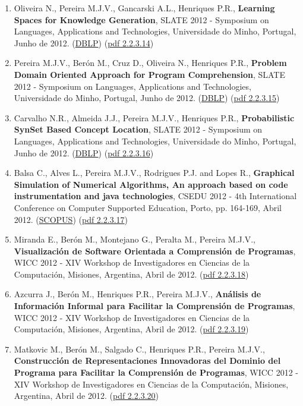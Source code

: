 \documentclass[11pt]{article}
\begin{document}
\begin{enumerate}
\item {Oliveira N., Pereira M.J.V., Gancarski A.L., Henriques P.R., {\bf{ Learning Spaces for Knowledge Generation}}, SLATE 2012 - Symposium on Languages, Applications and Technologies, Universidade do Minho, Portugal, Junho de 2012. (\href{run:Publicacoes/ComprovativosDBLP.pdf}{DBLP}) (\href{run:Publicacoes/publicacoes/69.pdf}{pdf 2.2.3.14})}
\item {Pereira M.J.V., Berón M., Cruz D., Oliveira N., Henriques P.R., {\bf{ Problem Domain Oriented Approach for Program Comprehension}}, SLATE 2012 - Symposium on Languages, Applications and Technologies, Universidade do Minho, Portugal, Junho de 2012. (\href{run:Publicacoes/ComprovativosDBLP.pdf}{DBLP}) (\href{run:Publicacoes/publicacoes/68.pdf}{pdf 2.2.3.15})}
\item {Carvalho N.R., Almeida J.J., Pereira M.J.V., Henriques P.R., {\bf{ Probabilistic SynSet Based Concept Location}}, SLATE 2012 - Symposium on Languages, Applications and Technologies, Universidade do Minho, Portugal, Junho de 2012. (\href{run:Publicacoes/ComprovativosDBLP.pdf}{DBLP}) (\href{run:Publicacoes/publicacoes/64.pdf}{pdf 2.2.3.16})}
\item {Balsa C., Alves L., Pereira M.J.V., Rodrigues P.J. and Lopes R., {\bf{ Graphical Simulation of Numerical Algorithms, An approach based on code instrumentation and java technologies}}, CSEDU 2012 - 4th International Conference on Computer Supported Education, Porto, pp. 164-169, Abril 2012. (\href{run:Publicacoes/PublicacoesSCOPUS.pdf}{SCOPUS}) (\href{run:Publicacoes/publicacoes/66.pdf}{pdf 2.2.3.17})}
\item {Miranda E., Berón M., Montejano G., Peralta M., Pereira M.J.V., {\bf{ Visualización de Software Orientada a Comprensión de Programas}}, WICC 2012 - XIV Workshop de Investigadores en Ciencias de la Computación, Misiones, Argentina, Abril de 2012. (\href{run:Publicacoes/publicacoes/67.pdf}{pdf 2.2.3.18})}
\item {Azcurra J., Berón M., Henriques P.R., Pereira M.J.V., {\bf{ Análisis de Información Informal para Facilitar la Comprensión de Programas}}, WICC 2012 - XIV Workshop de Investigadores en Ciencias de la Computación, Misiones, Argentina, Abril de 2012. (\href{run:Publicacoes/publicacoes/65.pdf}{pdf 2.2.3.19})}
\item {Matkovic M., Berón M., Salgado C., Henriques P.R., Pereira M.J.V., {\bf{ Construcción de Representaciones Innovadoras del Dominio del Programa para Facilitar la Comprensión de Programas}}, WICC 2012 - XIV Workshop de Investigadores en Ciencias de la Computación, Misiones, Argentina, Abril de 2012. (\href{run:Publicacoes/publicacoes/70.pdf}{pdf 2.2.3.20})}

\end{enumerate}
\end{document}
